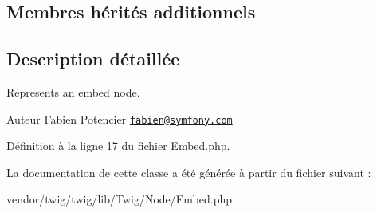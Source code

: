 \subsection*{Membres hérités additionnels}


\subsection{Description détaillée}
Represents an embed node.

\begin{DoxyAuthor}{Auteur}
Fabien Potencier \href{mailto:fabien@symfony.com}{\tt fabien@symfony.\+com} 
\end{DoxyAuthor}


Définition à la ligne 17 du fichier Embed.\+php.



La documentation de cette classe a été générée à partir du fichier suivant \+:\begin{DoxyCompactItemize}
\item 
vendor/twig/twig/lib/\+Twig/\+Node/Embed.\+php\end{DoxyCompactItemize}
